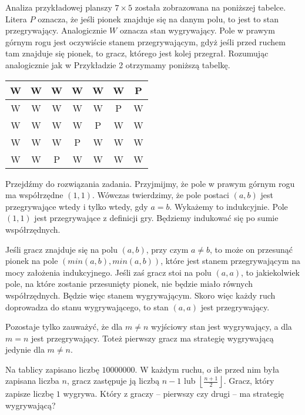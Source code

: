\noindent
Analiza przykładowej planszy $7 \times 5$ została zobrazowana na poniższej tabelce. Litera $P$ oznacza, że jeśli pionek znajduje się na danym polu, to jest to stan przegrywający. Analogicznie $W$ oznacza stan wygrywający. Pole w prawym górnym rogu jest oczywiście stanem przegrywającym, gdyż jeśli przed ruchem tam znajduje się pionek, to gracz, którego jest kolej przegrał. Rozumując analogicznie jak w Przykładzie 2 otrzymamy poniższą tabelkę.
\begin{center}
\begin{tabular}{ |c|c|c|c|c|c|c|} 
 \hline
 W & W & W & W & W & W & P \\ 
 \hline
 W & W & W & W & W & P & W \\ 
 \hline
 W & W & W & W & P & W & W \\ 
 \hline
 W & W & W & P & W & W & W \\ 
 \hline
 W & W & P & W & W & W & W \\ 
 \hline
\end{tabular}
\end{center}

\noindent
Przejdźmy do rozwiązania zadania. Przyjmijmy, że pole w prawym górnym rogu ma współrzędne $(1, 1)$. Wówczas twierdzimy, że pole postaci $(a, b)$ jest przegrywające wtedy i tylko wtedy, gdy $a = b$. Wykażemy to indukcyjnie. Pole $(1, 1)$ jest przegrywające z definicji gry. Będziemy indukować się po sumie współrzędnych.

\vspace{10px}
\noindent
Jeśli gracz znajduje się na polu $(a, b)$, przy czym $a \neq b$, to może on przesunąć pionek na pole $(min(a, b), min(a, b))$, które jest stanem przegrywającym na mocy założenia indukcyjnego. Jeśli zaś gracz stoi na polu $(a, a)$, to jakiekolwiek pole, na które zostanie przesunięty pionek, nie będzie miało równych współrzędnych. Będzie więc stanem wygrywającym. Skoro więc każdy ruch doprowadza do stanu wygrywającego, to stan $(a, a)$ jest przegrywający.

\vspace{10px}
\noindent
Pozostaje tylko zauważyć, że dla $m \neq n$ wyjściowy stan jest wygrywający, a dla $m = n$ jest przegrywający. Toteż pierwszy gracz ma strategię wygrywającą jedynie dla $m \neq n$.

\begin{problem}{3}
	Na tablicy zapisano liczbę $10000000$. W każdym ruchu, o ile przed nim była zapisana liczba $n$, gracz zastępuje ją liczbą $n - 1$ lub $\left\lfloor\frac{n + 1}{2}\right\rfloor$. Gracz, który zapisze liczbę $1$ wygrywa. Który z graczy – pierwszy czy drugi – ma strategię wygrywającą?
\end{problem}

